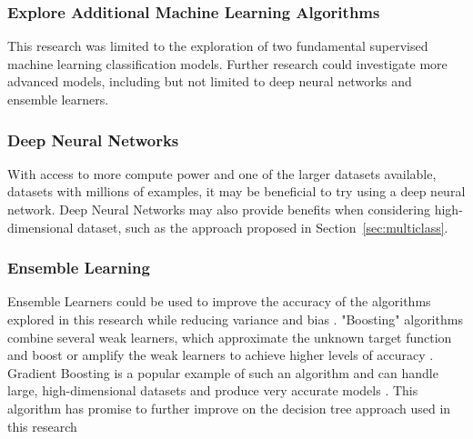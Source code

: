 \documentclass[12pt]{article}
\begin{document}
\subsubsection{Explore Additional Machine Learning Algorithms}
This research was limited to the exploration of two fundamental supervised machine learning classification models. Further research could investigate more advanced models, including but not limited to deep neural networks and ensemble learners.

\subsubsection{Deep Neural Networks}
With access to more compute power and one of the larger datasets available, datasets with millions of examples, it may be beneficial to try using a deep neural network. Deep Neural Networks may also provide benefits when considering high-dimensional dataset, such as the approach proposed in Section~\ref{sec:multiclass}.

\subsubsection{Ensemble Learning}
Ensemble Learners could be used to improve the accuracy of the algorithms explored in this research while reducing variance and bias \cite[Chapter 7, Section 7.5]{100MLB}. "Boosting" algorithms combine several weak learners, which approximate the unknown target function and boost or amplify the weak learners to achieve higher levels of accuracy \cite{Kearns1996}. Gradient Boosting is a popular example of such an algorithm and can handle large, high-dimensional datasets and produce very accurate models \cite{greeksGeeksGB}. This algorithm has promise to further improve on the decision tree approach used in this research

\newpage

\end{document}
